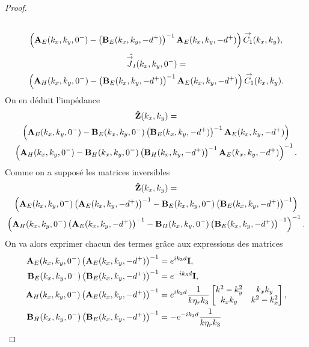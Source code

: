 \begin{proof}
\begin{multline*}
            \\
            \left(\mathbf{A}_E(k_x,k_y,0^-)-\left(\mathbf{B}_E(k_x,k_y,-d^+)\right)^{-1}\mathbf{A}_E(k_x,k_y,-d^+)\right){\overset{\rightarrow}{C_1}}(k_x,k_y),
          \end{multline*}
          \begin{multline*}
            \hat{{\overset{\rightarrow}{J}}_t}(k_x,k_y,0^-) =
            \\
            \left(\mathbf{A}_H(k_x,k_y,0^-)-\left(\mathbf{B}_E(k_x,k_y,-d^+)\right)^{-1}\mathbf{A}_E(k_x,k_y,-d^+)\right){\overset{\rightarrow}{C_1}}(k_x,k_y).
          \end{multline*}
          On en déduit l'impédance
          \begin{multline*}
            \hat {\mathbf{Z}}(k_x,k_y) =
            \\
            \left(\mathbf{A}_E(k_x,k_y,0^-)-\mathbf{B}_E(k_x,k_y,0^-)\left(\mathbf{B}_E(k_x,k_y,-d^+)\right)^{-1}\mathbf{A}_E(k_x,k_y,-d^+)\right)
            \\
            \left(\mathbf{A}_H(k_x,k_y,0^-)-\mathbf{B}_H(k_x,k_y,0^-)\left(\mathbf{B}_H(k_x,k_y,-d^+)\right)^{-1}\mathbf{A}_E(k_x,k_y,-d^+)\right)^{-1}.
          \end{multline*}
          Comme on a supposé les matrices inversibles
        \begin{multline*}
            \hat {\mathbf{Z}}(k_x,k_y) =
            \\ \left(\mathbf{A}_E(k_x,k_y,0^-)\left(\mathbf{A}_E(k_x,k_y,-d^+)\right)^{-1}-\mathbf{B}_E(k_x,k_y,0^-)\left(\mathbf{B}_E(k_x,k_y,-d^+)\right)^{-1}\right) 
            \\
            \left(\mathbf{A}_H(k_x,k_y,0^-)\left(\mathbf{A}_E(k_x,k_y,-d^+)\right)^{-1}-\mathbf{B}_H(k_x,k_y,0^-)\left(\mathbf{B}_E(k_x,k_y,-d^+)\right)^{-1}\right)^{-1}.
          \end{multline*}
          On va alors exprimer chacun des termes grâce aux expressions des matrices
          \begin{align*}
            \mA_E(k_x,k_y,0^-)\left(\mA_E(k_x,k_y,-d^+)\right)^{-1} &= e^{ik_3d}\mI,
            \\
            \mB_E(k_x,k_y,0^-)\left(\mB_E(k_x,k_y,-d^+)\right)^{-1} &= e^{-ik_3d}\mI,
            \\
            \mA_H(k_x,k_y,0^-)\left(\mA_E(k_x,k_y,-d^+)\right)^{-1} &= e^{ik_3d}\frac{1}{k\eta_r k_3}
            \begin{bmatrix}
              k^2 - k_y^2 & k_x k_y
              \\
              k_x k _y & k^2 - k_x^2
            \end{bmatrix},
            \\
            \mB_H(k_x,k_y,0^-)\left(\mB_E(k_x,k_y,-d^+)\right)^{-1} &= -e^{-ik_3d}\frac{1}{k\eta_r k_3}

\end{align*}
\end{proof}
